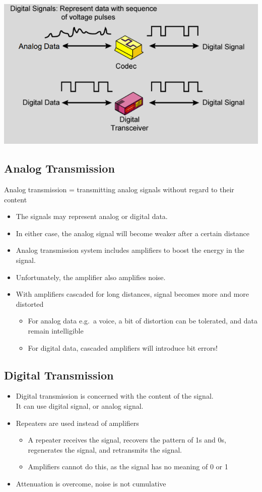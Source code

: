 \documentclass[11pt]{article}
\begin{document}
\includegraphics[width=\textwidth]{analog-signals-carrying-analog-and-digital-data-1.png}
\subsection{Analog Transmission}
Analog transmission = transmitting analog signals without regard to their content \\
\begin{itemize}
    \item The signals may represent analog or digital data.
    \item In either case, the analog signal will become weaker after a certain distance
    \item Analog transmission system includes amplifiers to boost the energy in the signal.
    \item Unfortunately, the amplifier also amplifies noise.
    \item With amplifiers cascaded for long distances, signal becomes more and more distorted
    \begin{itemize}
        \item For analog data e.g.\ a voice, a bit of distortion can be tolerated, and data remain intelligible
        \item For digital data, cascaded amplifiers will introduce bit errors!
    \end{itemize}
\end{itemize}
\subsection{Digital Transmission}
\begin{itemize}
    \item Digital transmission is concerned with the content of the signal. \\
    It can use digital signal, or analog signal.
    \item Repeaters are used instead of amplifiers \
    \begin{itemize}
        \item A repeater receives the signal, recovers the pattern of 1s and 0s, regenerates the signal, and retransmits the signal.
        \item Amplifiers cannot do this, as the signal has no meaning of 0 or 1
    \end{itemize}
    \item Attenuation is overcome, noise is not cumulative
\end{itemize}
\end{document}
